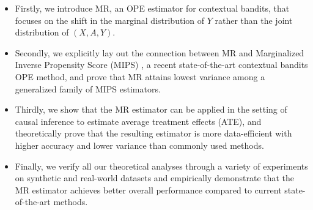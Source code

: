 \begin{itemize}
    \item Firstly, we introduce MR, an OPE estimator for contextual bandits, that focuses on the shift in the marginal distribution of $Y$ rather than the joint distribution of $(X, A, Y)$. 
    
    \item Secondly, we explicitly lay out the connection between MR and  Marginalized Inverse Propensity Score (MIPS) \cite{saito2022off}, a recent state-of-the-art contextual bandits OPE method, and prove that MR attains lowest variance among a generalized family of MIPS estimators. 
    \item Thirdly, we show that the MR estimator can be applied in the setting of causal inference to estimate average treatment effects (ATE), and theoretically prove that the resulting estimator is more data-efficient with higher accuracy and lower variance than commonly used methods. 
    \item Finally, we verify all our theoretical analyses through a variety of experiments on synthetic and real-world datasets and empirically demonstrate that the MR estimator achieves better overall performance compared to current state-of-the-art methods. 
\end{itemize}

